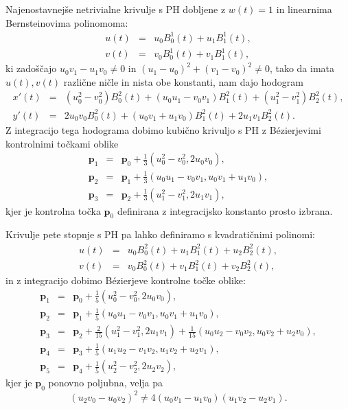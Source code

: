 \documentclass[a4paper]{article}
\begin{document}
	Najenostavnejše netrivialne krivulje s PH dobljene z $w (t) = 1$ in linearnima Bernsteinovima polinomoma:
	\begin{eqnarray}
	u (t) &=& u_0 B^1_0(t) + u_1 B^1_1(t),\nonumber\\
	v (t) &=& v_0 B^1_0(t) + v_1 B^1_1(t),\nonumber
	\end{eqnarray}
	ki zadoščajo $u_0v_1 - u_1v_0\not = 0$ in $(u_1 - u_0)^2+ (v_1 - v_0)^2\not = 0$, tako da imata $u (t), v (t)$ različne ničle in nista obe konstanti, nam dajo hodogram
	\begin{eqnarray}
	x\prime (t) &=& (u^2_0- v^2_0)B^2_0(t) + (u_0u_1-v_0v_1)B^2_1(t)+(u^2_1-v^2_1)B^2_2(t),\nonumber\\
	y\prime(t) &=& 2u_0v_0B^2_0(t)+(u_0v_1+u_1v_0)B^2_1(t)+2u_1v_1B^2_2(t).\nonumber
	\end{eqnarray}
	Z integracijo tega hodograma dobimo kubično krivuljo s PH z B\'ezierjevimi kontrolnimi točkami oblike
	\begin{eqnarray}
	\textbf{p}_1 &=& \textbf{p}_0 + \frac{1}{3}(u_0^2-v_0^2,2u_0v_0),\nonumber\\
	\textbf{p}_2 &=& \textbf{p}_1 + \frac{1}{3}(u_0u_1-v_0v_1,u_0v_1+u_1v_0),\nonumber\\
	\textbf{p}_3 &=& \textbf{p}_2 + \frac{1}{3}(u_1^2-v_1^2,2u_1v_1),\nonumber
	\end{eqnarray}
	kjer je kontrolna točka $\textbf{p}_0$ definirana z integracijsko konstanto prosto izbrana.
	
	Krivulje pete stopnje s PH pa lahko definiramo s kvadratičnimi polinomi:
	\begin{eqnarray}
	u(t) &=& u_0B_0^2(t)+u_1B_1^2(t)+u_2B_2^2(t),\nonumber\\
	v(t)&=&v_0B_0^2(t)+v_1B_1^2(t)+v_2B_2^2(t),\nonumber
	\end{eqnarray}
	in z integracijo dobimo B\'ezierjeve kontrolne točke oblike:
	\begin{eqnarray}
	\textbf{p}_1 &=& \textbf{p}_0 + \frac{1}{5}(u_0^2-v_0^2,2u_0v_0),\nonumber\\
	\textbf{p}_2 &=& \textbf{p}_1 + \frac{1}{5}(u_0u_1-v_0v_1,u_0v_1+u_1v_0),\nonumber\\
	\textbf{p}_3 &=& \textbf{p}_2 + \frac{2}{15}(u_1^2-v_1^2,2u_1v_1)+\frac{1}{15}(u_0u_2-v_0v_2,u_0v_2+u_2v_0),\nonumber\\
	\textbf{p}_4 &=& \textbf{p}_3 + \frac{1}{5}(u_1u_2-v_1v_2,u_1v_2+u_2v_1),\nonumber\\
	\textbf{p}_5 &=& \textbf{p}_4 + \frac{1}{5}(u_2^2-v_2^2,2u_2v_2),\nonumber
	\end{eqnarray}
	kjer je $\textbf{p}_0$ ponovno poljubna, velja pa
	$$(u_2v_0-u_0v_2)^2\not=4(u_0v_1-u_1v_0)(u_1v_2-u_2v_1).$$
	
\end{document}
